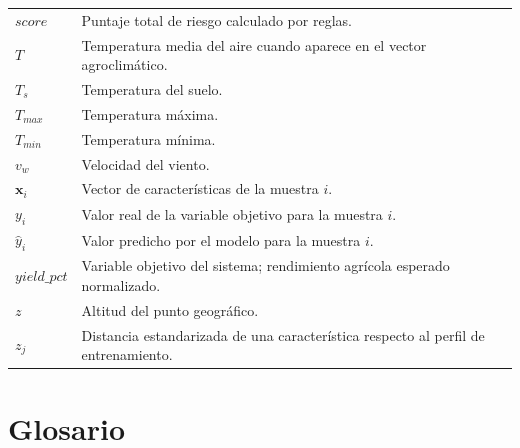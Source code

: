 \documentclass[12pt,letterpaper,oneside]{report}
\begin{document}
\begin{longtable}{p{3cm}p{9.5cm}}
$score$ & Puntaje total de riesgo calculado por reglas. \\
$T$ & Temperatura media del aire cuando aparece en el vector agroclimático. \\
$T_s$ & Temperatura del suelo. \\
$T_{max}$ & Temperatura máxima. \\
$T_{min}$ & Temperatura mínima. \\
$v_w$ & Velocidad del viento. \\
$\mathbf{x}_i$ & Vector de características de la muestra $i$. \\
$y_i$ & Valor real de la variable objetivo para la muestra $i$. \\
$\hat{y}_i$ & Valor predicho por el modelo para la muestra $i$. \\
$yield\_pct$ & Variable objetivo del sistema; rendimiento agrícola esperado normalizado. \\
$z$ & Altitud del punto geográfico. \\
$z_j$ & Distancia estandarizada de una característica respecto al perfil de entrenamiento. \\
\bottomrule
\end{longtable}

\chapter*{Glosario}
\end{document}
